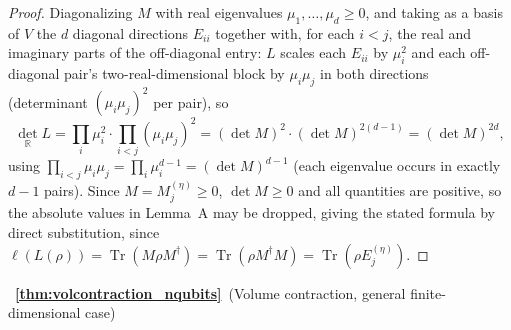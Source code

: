 \documentclass[11pt, onecolumn]{article}
\begin{document}
\begin{proof}
Diagonalizing $M$ with real eigenvalues $\mu_1,\dots,\mu_d\ge0$, and taking as a basis of $V$ the $d$ diagonal directions $E_{ii}$ together with, for each $i<j$, the real and imaginary parts of the off-diagonal entry: $L$ scales each $E_{ii}$ by $\mu_i^2$ and each off-diagonal pair's two-real-dimensional block by $\mu_i\mu_j$ in both directions (determinant $(\mu_i\mu_j)^2$ per pair), so
\[
\det_{\mathbb R}L = \prod_i\mu_i^2\cdot\prod_{i<j}(\mu_i\mu_j)^2 = (\det M)^2\cdot(\det M)^{2(d-1)} = (\det M)^{2d},
\]
using $\prod_{i<j}\mu_i\mu_j=\prod_i\mu_i^{d-1}=(\det M)^{d-1}$ (each eigenvalue occurs in exactly $d-1$ pairs). Since $M=M_j^{(\eta)}\ge0$, $\det M\ge0$ and all quantities are positive, so the absolute values in Lemma~A may be dropped, giving the stated formula by direct substitution, since $\ell(L(\rho))=\operatorname{Tr}(M\rho M^\dagger)=\operatorname{Tr}(\rho M^\dagger M)=\operatorname{Tr}(\rho E_j^{(\eta)})$.
\end{proof}

~{\bf \ref{thm:volcontraction_nqubits}}~(Volume contraction, general finite-dimensional case)
\end{document}
